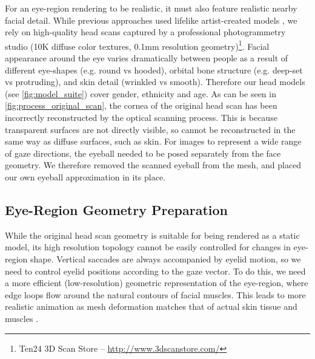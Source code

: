 For an eye-region rendering to be realistic, it must also feature realistic nearby facial detail.
While previous approaches used lifelike artist-created models \cite{swirski2014rendering}, we rely on high-quality head scans captured by a professional photogrammetry studio (10K diffuse color textures, 0.1mm resolution geometry)\footnote{Ten24 3D Scan Store -- \url{http://www.3dscanstore.com/}}.
Facial appearance around the eye varies dramatically between people as a result of different eye-shapes (e.g. round vs hooded), orbital bone structure (e.g. deep-set vs protruding), and skin detail (wrinkled vs smooth).
Therefore our head models (see \autoref{fig:model_suite}) cover gender, ethnicity and age.
As can be seen in \autoref{fig:process_original_scan}, the cornea of the original head scan has been incorrectly reconstructed by the optical scanning process.
This is because transparent surfaces are not directly visible, so cannot be reconstructed in the same way as diffuse surfaces, such as skin.
For images to represent a wide range of gaze directions, the eyeball needed to be posed separately from the face geometry.
We therefore removed the scanned eyeball from the mesh, and placed our own eyeball approximation in its place.

\subsection{Eye-Region Geometry Preparation}

While the original head scan geometry is suitable for being rendered as a static model, its high resolution topology cannot be easily controlled for changes in eye-region shape.
Vertical saccades are always accompanied by eyelid motion, so we need to control eyelid positions according to the gaze vector.
To do this, we need a more efficient (low-resolution) geometric representation of the eye-region, where edge loops flow around the natural contours of facial muscles.
This leads to more realistic animation as mesh deformation matches that of actual skin tissue and muscles \cite{orvalho2012facial}.

